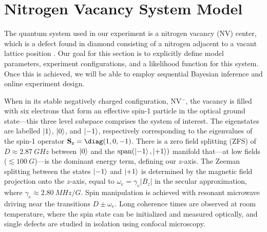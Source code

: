 \documentclass[aps,nofootinbib,twocolumn,superscriptaddress]{revtex4}
\begin{document}
\section{Nitrogen Vacancy System Model}
\label{sec:system-model}

The quantum system used in our experiment is a nitrogen vacancy (NV) center,
which is a defect found in diamond consisting of a nitrogen adjacent to
a vacant lattice position \cite{doherty_nitrogenvacancy_2013}.
Our goal for this section is to explicitly define model parameters, experiment
configurations, and a likelihood function for this system.
Once this is achieved, we will be able to employ sequential
Bayesian inference and online experiment design.

When in its stable negatively charged configuration, NV$^-$,
the vacancy is filled with
six electrons that form an effective spin-1 particle in the optical
ground state---this three level subspace comprises the system of interest.
The eigenstates are labelled $\ket{1}$, $\ket{0}$, and $\ket{-1}$, respectively
corresponding to the eigenvalues of the spin-1 operator $\Sz=\diag(1,0,-1)$.
There is a zero field splitting (ZFS) of $D\approx\SI{2.87}{GHz}$
between $\ket{0}$ and the $\operatorname{span}(\ket{-1},\ket{+1})$ manifold
that---at low fields ($\lesssim\SI{100}{G}$)---is the dominant energy term,
defining our $z$-axis.
The Zeeman splitting between the states $\ket{-1}$ and $\ket{+1}$
is determined by the magnetic field projection onto the $z$-axis, equal to
$\omega_e=\gamma_e |B_z|$ in the secular approximation,
where $\gamma_e\approx\SI{2.80}{MHz/G}$.
Spin manipulation is achieved with resonant microwave driving near
the transitions $D\pm\omega_e$.
Long coherence times are observed at room temperature, where
the spin state can be initialized and measured optically, and single
defects are studied in isolation using confocal microscopy.
\end{document}

